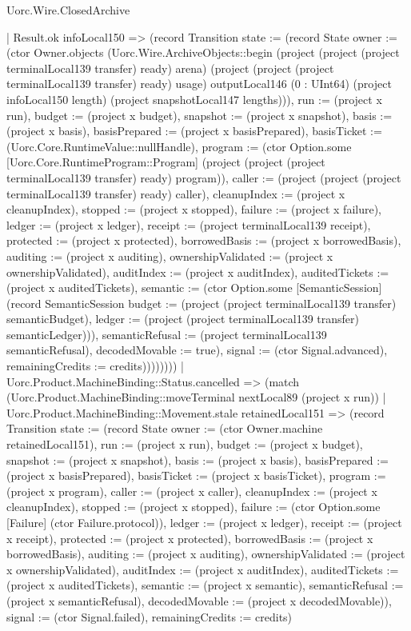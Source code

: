 \begin{lexlean}{Uorc.Wire.ClosedArchive}
\begin{semanticmodule}
{                | Result.ok infoLocal150 => (record Transition {state := (record State {owner := (ctor Owner.objects (Uorc.Wire.ArchiveObjects::begin (project (project (project terminalLocal139 transfer) ready) arena) (project (project (project terminalLocal139 transfer) ready) usage) outputLocal146 (0 : UInt64) (project infoLocal150 length) (project snapshotLocal147 lengths))), run := (project x run), budget := (project x budget), snapshot := (project x snapshot), basis := (project x basis), basisPrepared := (project x basisPrepared), basisTicket := (Uorc.Core.RuntimeValue::nullHandle), program := (ctor Option.some [Uorc.Core.RuntimeProgram::Program] (project (project (project terminalLocal139 transfer) ready) program)), caller := (project (project (project terminalLocal139 transfer) ready) caller), cleanupIndex := (project x cleanupIndex), stopped := (project x stopped), failure := (project x failure), ledger := (project x ledger), receipt := (project terminalLocal139 receipt), protected := (project x protected), borrowedBasis := (project x borrowedBasis), auditing := (project x auditing), ownershipValidated := (project x ownershipValidated), auditIndex := (project x auditIndex), auditedTickets := (project x auditedTickets), semantic := (ctor Option.some [SemanticSession] (record SemanticSession {budget := (project (project terminalLocal139 transfer) semanticBudget), ledger := (project (project terminalLocal139 transfer) semanticLedger)})), semanticRefusal := (project terminalLocal139 semanticRefusal), decodedMovable := true}), signal := (ctor Signal.advanced), remainingCredits := credits}))))))))
    | Uorc.Product.MachineBinding::Status.cancelled => (match (Uorc.Product.MachineBinding::moveTerminal nextLocal89 (project x run))
      | Uorc.Product.MachineBinding::Movement.stale retainedLocal151 => (record Transition {state := (record State {owner := (ctor Owner.machine retainedLocal151), run := (project x run), budget := (project x budget), snapshot := (project x snapshot), basis := (project x basis), basisPrepared := (project x basisPrepared), basisTicket := (project x basisTicket), program := (project x program), caller := (project x caller), cleanupIndex := (project x cleanupIndex), stopped := (project x stopped), failure := (ctor Option.some [Failure] (ctor Failure.protocol)), ledger := (project x ledger), receipt := (project x receipt), protected := (project x protected), borrowedBasis := (project x borrowedBasis), auditing := (project x auditing), ownershipValidated := (project x ownershipValidated), auditIndex := (project x auditIndex), auditedTickets := (project x auditedTickets), semantic := (project x semantic), semanticRefusal := (project x semanticRefusal), decodedMovable := (project x decodedMovable)}), signal := (ctor Signal.failed), remainingCredits := credits})
}
\end{semanticmodule}
\end{lexlean}
